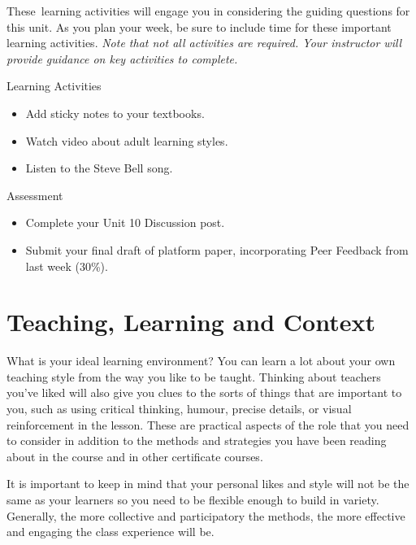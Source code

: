 \documentclass[
]{book}
\providecommand{\tightlist}{%
  \setlength{\itemsep}{0pt}\setlength{\parskip}{0pt}}
\begin{document}
These~learning activities will engage you in considering the guiding questions for this unit. As you plan your week, be sure to include time for these important learning activities. \emph{Note that not all activities are required. Your instructor will provide guidance on key activities to complete.}

\begin{reflect}
{Learning Activities}

\begin{itemize}
\tightlist
\item
  Add sticky notes to your textbooks.\\
\item
  Watch video about adult learning styles.\\
\item
  Listen to the Steve Bell song.
\end{itemize}
\end{reflect}

\begin{assessment}
{Assessment}

\begin{itemize}
\tightlist
\item
  Complete your Unit 10 Discussion post.\\
\item
  Submit your final draft of platform paper, incorporating Peer Feedback
  from last week (30\%).
\end{itemize}
\end{assessment}

\hypertarget{teaching-learning-and-context}{%
\section{Teaching, Learning and Context}\label{teaching-learning-and-context}}

What is your ideal learning environment? You can learn a lot about your own teaching style from the way you like to be taught. Thinking about teachers you've liked will also give you clues to the sorts of things that are important to you, such as using critical thinking, humour, precise details, or visual reinforcement in the lesson. These are practical aspects of the role that you need to consider in addition to the methods and strategies you have been reading about in the course and in other certificate courses.

It is important to keep in mind that your personal likes and style will not be the same as your learners so you need to be flexible enough to build in variety. Generally, the more collective and participatory the methods, the more effective and engaging the class experience will be.
\end{document}
